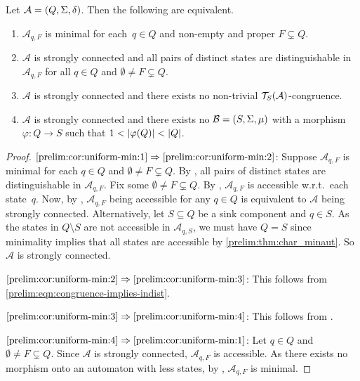 \begin{corollary}\label{prelim:cor:uniform-min}
Let $\mathcal A = (Q, \Sigma, \delta)$.
Then the following are equivalent.
\begin{enumerate}
\item \label{prelim:cor:uniform-min:1} $\mathcal A_{q,F}$ is minimal for each~$q \in Q$ and non-empty and proper $F \subsetneq Q$.

\item \label{prelim:cor:uniform-min:2} $\mathcal A$ is strongly connected and
 all pairs of distinct states are distinguishable in~$\mathcal A_{q,F}$
 for all $q \in Q$ and $\emptyset \ne F \subsetneq Q$.

\item \label{prelim:cor:uniform-min:3} $\mathcal A$ is strongly connected and there exists no non-trivial $\mathcal T_S(\mathcal A)$-congruence.

\item \label{prelim:cor:uniform-min:4} $\mathcal A$ is strongly connected and there exists no $\mathcal B = (S, \Sigma, \mu)$
with a morphism $\varphi \colon Q \to S$
such that $1 < |\varphi(Q)| < |Q|$.
\end{enumerate}
\end{corollary} 
\begin{proof}
$\ref{prelim:cor:uniform-min:1} \Rightarrow \ref{prelim:cor:uniform-min:2}$:
Suppose $\mathcal A_{q, F}$ is minimal for each $q \in Q$
and $\emptyset \ne F \subsetneq Q$.
By ,
all pairs of distinct states are distinguishable in $\mathcal A_{q,F}$.
Fix some $\emptyset \ne F \subsetneq Q$. By ,
$\mathcal A_{q,F}$ is accessible w.r.t.~each state~$q$. Now,
by ,
 $\mathcal A_{q,F}$ being accessible for any $q \in Q$
is equivalent to $\mathcal A$ being strongly connected. 
Alternatively, let $S \subseteq Q$ be a sink component
and $q \in S$. As the states in $Q \setminus S$ are not accessible
in $\mathcal A_{q, S}$, we must have $Q = S$ since minimality implies that all states
are accessible by \cref{prelim:thm:char_minaut}.
So $\mathcal A$ is strongly connected. 

$\ref{prelim:cor:uniform-min:2} \Rightarrow \ref{prelim:cor:uniform-min:3}$:
This follows from \cref{prelim:eqn:congruence-implies-indist}. 

$\ref{prelim:cor:uniform-min:3} \Rightarrow \ref{prelim:cor:uniform-min:4}$:
This follows from .

$\ref{prelim:cor:uniform-min:4} \Rightarrow \ref{prelim:cor:uniform-min:1}$:
Let $q \in Q$ and $\emptyset \ne F \subsetneq Q$. Since $\mathcal A$
is strongly connected, $\mathcal A_{q,F}$ is accessible.
As there exists no morphism onto an automaton with less states,
by , $\mathcal A_{q, F}$ is minimal.
\end{proof}

